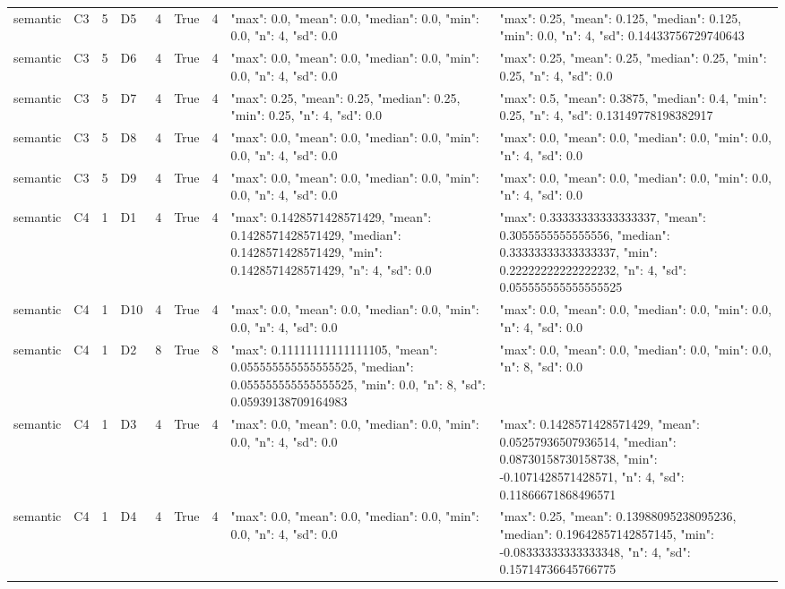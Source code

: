\begin{tabular}{lllllllll}
semantic & C3 & 5 & D5 & 4 & True & 4 & {"max": 0.0, "mean": 0.0, "median": 0.0, "min": 0.0, "n": 4, "sd": 0.0} & {"max": 0.25, "mean": 0.125, "median": 0.125, "min": 0.0, "n": 4, "sd": 0.14433756729740643} \\
semantic & C3 & 5 & D6 & 4 & True & 4 & {"max": 0.0, "mean": 0.0, "median": 0.0, "min": 0.0, "n": 4, "sd": 0.0} & {"max": 0.25, "mean": 0.25, "median": 0.25, "min": 0.25, "n": 4, "sd": 0.0} \\
semantic & C3 & 5 & D7 & 4 & True & 4 & {"max": 0.25, "mean": 0.25, "median": 0.25, "min": 0.25, "n": 4, "sd": 0.0} & {"max": 0.5, "mean": 0.3875, "median": 0.4, "min": 0.25, "n": 4, "sd": 0.13149778198382917} \\
semantic & C3 & 5 & D8 & 4 & True & 4 & {"max": 0.0, "mean": 0.0, "median": 0.0, "min": 0.0, "n": 4, "sd": 0.0} & {"max": 0.0, "mean": 0.0, "median": 0.0, "min": 0.0, "n": 4, "sd": 0.0} \\
semantic & C3 & 5 & D9 & 4 & True & 4 & {"max": 0.0, "mean": 0.0, "median": 0.0, "min": 0.0, "n": 4, "sd": 0.0} & {"max": 0.0, "mean": 0.0, "median": 0.0, "min": 0.0, "n": 4, "sd": 0.0} \\
semantic & C4 & 1 & D1 & 4 & True & 4 & {"max": 0.1428571428571429, "mean": 0.1428571428571429, "median": 0.1428571428571429, "min": 0.1428571428571429, "n": 4, "sd": 0.0} & {"max": 0.33333333333333337, "mean": 0.3055555555555556, "median": 0.33333333333333337, "min": 0.22222222222222232, "n": 4, "sd": 0.055555555555555525} \\
semantic & C4 & 1 & D10 & 4 & True & 4 & {"max": 0.0, "mean": 0.0, "median": 0.0, "min": 0.0, "n": 4, "sd": 0.0} & {"max": 0.0, "mean": 0.0, "median": 0.0, "min": 0.0, "n": 4, "sd": 0.0} \\
semantic & C4 & 1 & D2 & 8 & True & 8 & {"max": 0.11111111111111105, "mean": 0.055555555555555525, "median": 0.055555555555555525, "min": 0.0, "n": 8, "sd": 0.05939138709164983} & {"max": 0.0, "mean": 0.0, "median": 0.0, "min": 0.0, "n": 8, "sd": 0.0} \\
semantic & C4 & 1 & D3 & 4 & True & 4 & {"max": 0.0, "mean": 0.0, "median": 0.0, "min": 0.0, "n": 4, "sd": 0.0} & {"max": 0.1428571428571429, "mean": 0.05257936507936514, "median": 0.08730158730158738, "min": -0.1071428571428571, "n": 4, "sd": 0.11866671868496571} \\
semantic & C4 & 1 & D4 & 4 & True & 4 & {"max": 0.0, "mean": 0.0, "median": 0.0, "min": 0.0, "n": 4, "sd": 0.0} & {"max": 0.25, "mean": 0.13988095238095236, "median": 0.19642857142857145, "min": -0.08333333333333348, "n": 4, "sd": 0.15714736645766775} \\

\end{tabular}

